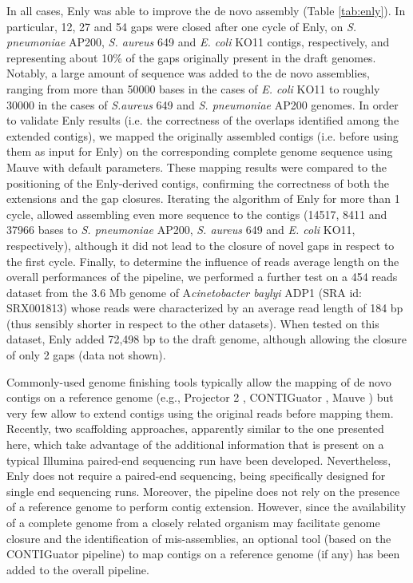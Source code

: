 In all cases, Enly was able to improve the de novo assembly (Table \ref{tab:enly}). In particular, 12, 27 and 54 gaps were closed after one cycle of Enly, on \textit{S. pneumoniae} AP200, \textit{S. aureus} 649 and \textit{E. coli} KO11 contigs, respectively, and representing about 10\% of the gaps originally present in the draft genomes. Notably, a large amount of sequence was added to the de novo assemblies, ranging from more than 50000 bases in the cases of \textit{E. coli} KO11 to roughly 30000 in the cases of \textit{S.aureus} 649 and \textit{S. pneumoniae} AP200 genomes. In order to validate Enly results (i.e. the correctness of the overlaps identified among the extended contigs), we mapped the originally assembled contigs (i.e. before using them as input for Enly) on the corresponding complete genome sequence using Mauve \cite{darling2004mauve} with default parameters. These mapping results were compared to the positioning of the Enly-derived contigs, confirming the correctness of both the extensions and the gap closures. Iterating the algorithm of Enly for more than 1 cycle, allowed assembling even more sequence to the contigs (14517, 8411 and 37966 bases to \textit{S. pneumoniae} AP200, \textit{S. aureus} 649 and \textit{E. coli} KO11, respectively), although it did not lead to the closure of novel gaps in respect to the first cycle. 
Finally, to determine the influence of reads average length on the overall performances of the pipeline, we performed a further test on a 454 reads dataset from the 3.6 Mb genome of A\textit{cinetobacter baylyi} ADP1 (SRA id: SRX001813) whose reads were characterized by an average read length of 184 bp (thus sensibly shorter in respect to the other datasets). When tested on this dataset, Enly added 72,498 bp to the draft genome, although allowing the closure of only 2 gaps (data not shown).

Commonly-used genome finishing tools typically allow the mapping of de novo contigs on a reference genome (e.g., Projector 2 \cite{van2005projector}, CONTIGuator \cite{galardini2011contiguator}, Mauve \cite{darling2004mauve}) but very few allow to extend contigs using the original reads before mapping them. Recently, two scaffolding approaches, apparently similar to the one presented here, which take advantage of the additional information that is present on a typical Illumina paired-end sequencing run \cite{boetzer2012toward}\cite{tsai2010improving} have been developed. Nevertheless, Enly does not require a paired-end sequencing, being specifically designed for single end sequencing runs. Moreover, the pipeline does not rely on the presence of a reference genome to perform contig extension. However, since the availability of a complete genome from a closely related organism may facilitate genome closure and the identification of mis-assemblies, an optional tool (based on the CONTIGuator pipeline) to map contigs on a reference genome (if any) has been added to the overall pipeline.

